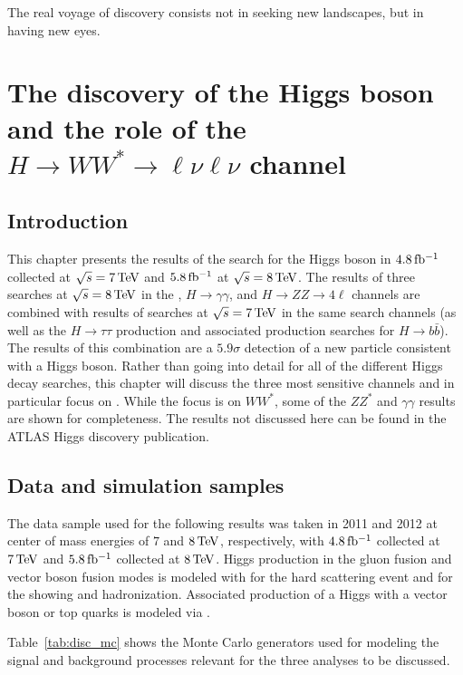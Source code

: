 \begin{savequote}[75mm]
The real voyage of discovery consists not in seeking new landscapes, but in having new eyes.
\end{savequote}

\chapter{The discovery of the Higgs boson and the role of the $H\rightarrow WW^{*}\rightarrow \ell\nu\ell\nu$ channel}

\section{Introduction}

This chapter presents the results of the search for the Higgs boson in $4.8 \mbox{\,fb$^{-1}$}$ collected at $\sqrt{s} = 7 \TeV$ and $5.8 \mbox{\,fb$^{-1}$}$ at $\sqrt{s} = 8 \TeV$. The results of three searches at $\sqrt{s} = 8 \TeV$ in the \HWWfull, $H\to \gamma \gamma$, and $H\to ZZ \to 4\ell$ channels are combined with results of searches at $\sqrt{s} = 7 \TeV$ in the same search channels (as well as the $H\to\tau\tau$ production and associated production searches for $H\to b\bar{b}$). The results of this combination are a $5.9 \sigma$ detection of a new particle consistent with a Higgs boson. Rather than going into detail for all of the different Higgs decay searches, this chapter will discuss the three most sensitive channels and in particular focus on \HWWfull. While the focus is on $WW^*$, some of the $ZZ^*$ and $\gamma\gamma$ results are shown for completeness. The results not discussed here can be found in the ATLAS Higgs discovery publication\cite{Discovery}.


\section{Data and simulation samples}

The data sample used for the following results was taken in 2011 and 2012 at center of mass energies of $7$ and $8 \TeV$, respectively, with $4.8 \mbox{\,fb$^{-1}$}$ collected at $7 \TeV$ and $5.8 \mbox{\,fb$^{-1}$}$ collected at $8 \TeV$. Higgs production in the gluon fusion and vector boson fusion modes is modeled with \POWHEG for the hard scattering event and \PYTHIA for the showing and hadronization. Associated production of a Higgs with a vector boson or top quarks is modeled via \PYTHIA. 

Table~\ref{tab:disc_mc} shows the Monte Carlo generators used for modeling the signal and background processes relevant for the three analyses to be discussed. 

